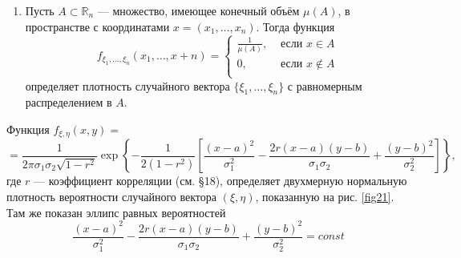 \begin{example}
	\begin{enumerate}
		\item Пусть $A \subset \mathbb{R}_n$ — множество, имеющее конечный
			объём $\mu(A)$, в пространстве с координатами $x = (x_1,\dots, x_n)$. Тогда функция
			\begin{equation*}
				f_{\xi_1,\dots,\xi_n}(x_1,\dots,x+n)=
				\begin{cases}
					\frac{1}{\mu(A)}, &\text{ если } x\in A\\
					0, &\text{ если } x\notin A\\
				\end{cases}
			\end{equation*}
			определяет плотность случайного вектора $\{\xi_1,\dots,\xi_n\}$ с равномерным распределением в $A$.
	\end{enumerate}
		\item Функция $f_{\xi,\eta}(x,y)=$
		\begin{equation*}
			=\frac{1}{2\pi\sigma_1\sigma_2\sqrt{1-r^2}}\exp
			\left\{
				-\frac{1}{2(1-r^2)}
			\left[
				\frac{(x-a)^2}{\sigma_1^2}-\frac{2r(x-a)(y-b)}{\sigma_1\sigma_2}+\frac{(y-b)^2}{\sigma_2^2} 
			\right] 
			\right\},
		\end{equation*}
		где $r$ — коэффициент корреляции (см. §18), определяет двухмерную нормальную плотность вероятности случайного вектора $(\xi, \eta)$, показанную на рис. \ref{fig21}. Там же показан эллипс равных вероятностей
		\begin{equation*}
			\frac{(x-a)^2}{\sigma_1^2}-\frac{2r(x-a)(y-b)}{\sigma_1\sigma_2}+\frac{(y-b)^2}{\sigma_2^2}=const
		\end{equation*}
\begin{figure}[H]
	\centering

\end{figure}
\end{example}
